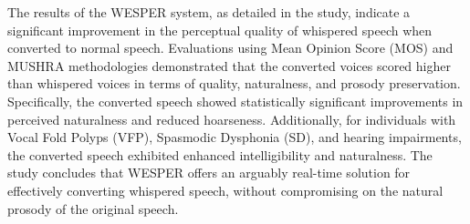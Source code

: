 The results of the WESPER system, as detailed in the study, indicate a significant improvement in the perceptual quality of whispered speech when converted to normal speech. Evaluations using Mean Opinion Score (MOS) and MUSHRA \cite{internationaltelecommunicationunionBS15343Method2015} methodologies demonstrated that the converted voices scored higher than whispered voices in terms of quality, naturalness, and prosody preservation. Specifically, the converted speech showed statistically significant improvements in perceived naturalness and reduced hoarseness. Additionally, for individuals with Vocal Fold Polyps (VFP), Spasmodic Dysphonia (SD), and hearing impairments, the converted speech exhibited enhanced intelligibility and naturalness. The study concludes that WESPER offers an arguably real-time solution for effectively converting whispered speech, without compromising on the natural prosody of the original speech.





